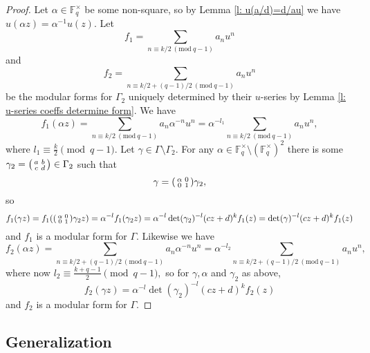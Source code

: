 \documentclass[11pt]{amsart}
\theoremstyle{definition}
\newenvironment{psmallmatrix}
{\left(\begin{smallmatrix}}
	{\end{smallmatrix}\right)}
\numberwithin{equation}{section}
\newcommand{\bbF}{\mathbb{F}}		%
\newcommand{\Mod}[1]{\ (\mathrm{mod}\ #1)}
\begin{document}
\begin{proof}
Let $\alpha\in \bbF_q^{\times}$ be some non-square, so by Lemma \ref{l: u(a/d)=d/au} we have $u(\alpha z)=\alpha^{-1}u(z).$ Let \[f_1=\sum_{n\equiv k/2\Mod{q-1}}a_nu^n\] and \[f_2=\sum_{n\equiv k/2+(q-1)/2\Mod{q-1}} a_nu^n\] be the modular forms for $\Gamma_2$ uniquely determined by their $u$-series by Lemma \ref{l: u-series coeffs determine form}. We have \[f_1(\alpha z)=\sum_{n\equiv k/2\Mod{q-1}}a_n\alpha^{-n}u^n=\alpha^{-l_1}\sum_{n\equiv k/2\Mod{q-1}}a_nu^n,\] where $\displaystyle{l_1\equiv \frac{k}{2}\pmod{q-1}}.$ Let $\gamma\in \Gamma\setminus \Gamma_2.$ For any $\alpha\in \bbF_q^{\times}\setminus(\bbF_q^{\times})^2$ there is some $\displaystyle{\gamma_2=\begin{psmallmatrix}a&b\\c&d\end{psmallmatrix}\in \Gamma_2}$ such that \[\gamma=\begin{psmallmatrix}\alpha&0\\0&1\end{psmallmatrix}\gamma_2,\] so 
\[f_1(\gamma z)=f_1(\begin{psmallmatrix}\alpha&0\\0&1\end{psmallmatrix}\gamma_2 z)=\alpha^{-l}f_1(\gamma_2 z)=\alpha^{-l}\det(\gamma_2)^{-l}(cz+d)^kf_1(z)=\det(\gamma)^{-l}(cz+d)^kf_1(z)\] and $f_1$ is a modular form for $\Gamma.$ Likewise we have 
\[f_2(\alpha z)=\sum_{n\equiv k/2+(q-1)/2\Mod{q-1}} a_n\alpha^{-n}u^n=\alpha^{-l_2}\sum_{n\equiv k/2+(q-1)/2\Mod{q-1}} a_nu^n,\]
where now $\displaystyle{l_2\equiv \frac{k+q-1}{2}}\pmod{q-1},$ so for $\gamma,\alpha$ and $\gamma_2$ as above,
\[f_2(\gamma z)=\alpha^{-l}\det(\gamma_2)^{-l}(cz+d)^kf_2(z)\] and $f_2$ is a modular form for $\Gamma.$
\end{proof}


\subsection{Generalization}
\end{document}
